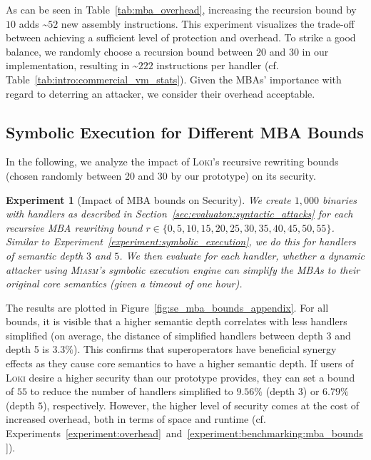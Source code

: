 \documentclass[letterpaper,twocolumn,10pt]{article}
\newcommand{\cf}{cf.\xspace}
\newcommand{\ex}[1]{Experiment~\ref{#1}}
\theoremstyle{customexample}
\theoremstyle{customexperiment}
\newtheorem{experiment}{Experiment}
\newcommand{\loki}{\textsc{Loki}\xspace}
\newcommand{\miasm}{\textsc{Miasm}\xspace}
\begin{document}
\begin{table}[htb]
\centering
\caption{Average number of assembly instructions per handler for various recursion bounds.}
\label{tab:mba_overhead} \end{table}

As can be seen in Table~\ref{tab:mba_overhead}, increasing the recursion bound by $10$ adds \textasciitilde$52$ new assembly instructions.
This experiment visualizes the trade-off between achieving a sufficient level of protection and overhead. To strike a good balance, we randomly choose a recursion bound between $20$ and $30$ in our implementation, resulting in \textasciitilde$222$ instructions per handler (cf. Table~\ref{tab:intro:commercial_vm_stats}). Given the MBAs' importance with regard to deterring an attacker, we consider their overhead acceptable.


\subsection{Symbolic Execution for Different MBA Bounds}\label{sec:appendix:se_mba_bounds}

In the following, we analyze the impact of \loki's recursive rewriting bounds (chosen randomly between 20 and 30 by our prototype) on its security.

\begin{experiment}[Impact of MBA bounds on Security]
We create $1,000$ binaries with handlers as described in Section~\ref{sec:evaluaton:syntactic_attacks} for each recursive MBA rewriting bound $r \in\{0, 5, 10, 15, 20, 25, 30, 35, 40, 45, 50, 55\}$. 
Similar to \ex{experiment:symbolic_execution}, we do this for handlers of semantic depth $3$ and $5$.
We then evaluate for each handler, whether a dynamic attacker using \miasm's symbolic execution engine can simplify the MBAs to their original core semantics (given a timeout of one hour).
\end{experiment}


The results are plotted in Figure~\ref{fig:se_mba_bounds_appendix}. 
For all bounds, it is visible that a higher semantic depth correlates with less handlers simplified (on average, the distance of simplified handlers between depth 3 and depth 5 is $3.3\%$). This confirms that superoperators have beneficial synergy effects as they cause core semantics to have a higher semantic depth.
If users of \loki desire a higher security than our prototype provides, they can set a bound of $55$ to reduce the number of handlers simplified to $9.56\%$ (depth 3) or $6.79\%$ (depth $5$), respectively. However, the higher level of security comes at the cost of increased overhead, both in terms of space and runtime (\cf Experiments~\ref{experiment:overhead}~and~\ref{experiment:benchmarking:mba_bounds}).
\end{document}
